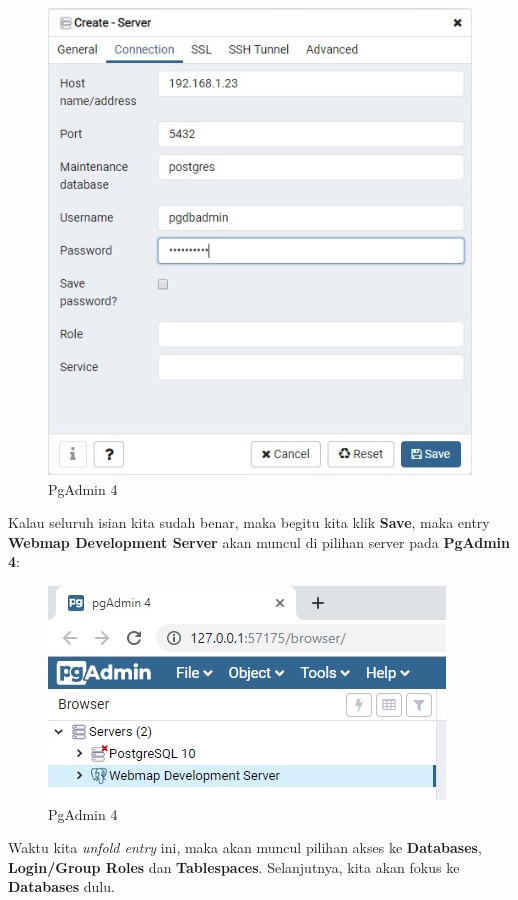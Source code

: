\documentclass[]{book}
\begin{document}
\begin{figure}
\centering
\includegraphics{./img/pgadmin4-create-connection.jpg}
\caption{PgAdmin 4}
\end{figure}

Kalau seluruh isian kita sudah benar, maka begitu kita klik \textbf{Save}, maka entry \textbf{Webmap Development Server} akan muncul di pilihan server pada \textbf{PgAdmin 4}:

\begin{figure}
\centering
\includegraphics{./img/pgadmin4-connection-created.jpg}
\caption{PgAdmin 4}
\end{figure}

Waktu kita \emph{unfold entry} ini, maka akan muncul pilihan akses ke \textbf{Databases}, \textbf{Login/Group Roles} dan \textbf{Tablespaces}. Selanjutnya, kita akan fokus ke \textbf{Databases} dulu.
\end{document}
